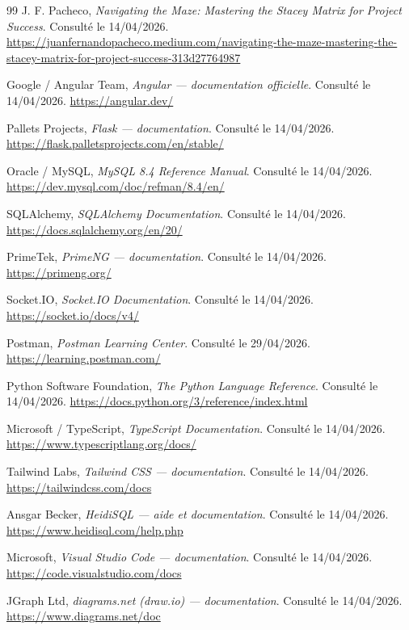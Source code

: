 \begin{thebibliography}{99}
J. F. Pacheco, \textit{Navigating the Maze: Mastering the Stacey Matrix for Project Success}. Consulté le 14/04/2026. \url{https://juanfernandopacheco.medium.com/navigating-the-maze-mastering-the-stacey-matrix-for-project-success-313d27764987}

Google / Angular Team, \textit{Angular — documentation officielle}. Consulté le 14/04/2026. \url{https://angular.dev/}

Pallets Projects, \textit{Flask — documentation}. Consulté le 14/04/2026. \url{https://flask.palletsprojects.com/en/stable/}

Oracle / MySQL, \textit{MySQL 8.4 Reference Manual}. Consulté le 14/04/2026. \url{https://dev.mysql.com/doc/refman/8.4/en/}

SQLAlchemy, \textit{SQLAlchemy Documentation}. Consulté le 14/04/2026. \url{https://docs.sqlalchemy.org/en/20/}

PrimeTek, \textit{PrimeNG — documentation}. Consulté le 14/04/2026. \url{https://primeng.org/}

Socket.IO, \textit{Socket.IO Documentation}. Consulté le 14/04/2026. \url{https://socket.io/docs/v4/}

Postman, \textit{Postman Learning Center}. Consulté le 29/04/2026. \url{https://learning.postman.com/}

Python Software Foundation, \textit{The Python Language Reference}. Consulté le 14/04/2026. \url{https://docs.python.org/3/reference/index.html}

Microsoft / TypeScript, \textit{TypeScript Documentation}. Consulté le 14/04/2026. \url{https://www.typescriptlang.org/docs/}

Tailwind Labs, \textit{Tailwind CSS — documentation}. Consulté le 14/04/2026. \url{https://tailwindcss.com/docs}

Ansgar Becker, \textit{HeidiSQL — aide et documentation}. Consulté le 14/04/2026. \url{https://www.heidisql.com/help.php}

Microsoft, \textit{Visual Studio Code — documentation}. Consulté le 14/04/2026. \url{https://code.visualstudio.com/docs}

JGraph Ltd, \textit{diagrams.net (draw.io) — documentation}. Consulté le 14/04/2026. \url{https://www.diagrams.net/doc}


\end{thebibliography}
